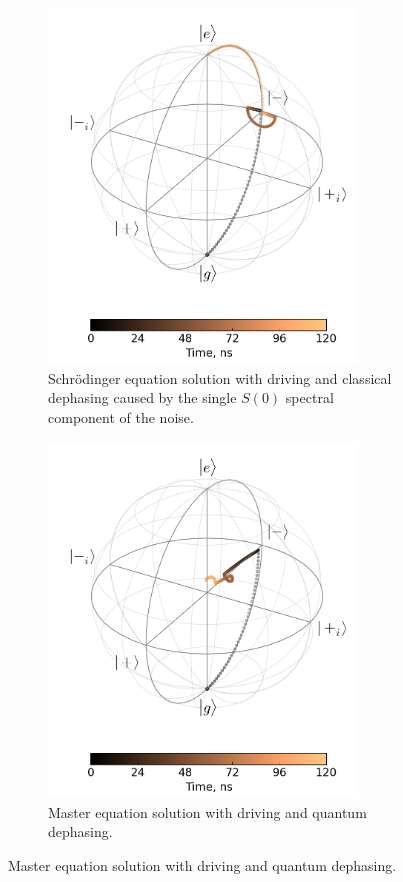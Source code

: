 \documentclass[12pt]{report}
\numberwithin{equation}{section}
\begin{document}
\begin{figure}
\begingroup
\captionsetup[subfigure]{width=0.9\textwidth}
\centering
\begin{subfigure}[t]{0.45\textwidth}
\centering
\includegraphics[width=0.9\textwidth]{cse_bloch_rf}
\caption{Schrödinger equation solution with driving and classical dephasing caused by the single $S(0)$ spectral component of the noise.}
\end{subfigure}
\begin{subfigure}[t]{0.45\textwidth}
\centering
\includegraphics[width=0.9\textwidth]{qse_bloch_rf}
\caption{Master equation solution with driving and quantum dephasing.}
\end{subfigure}


\end{figure}
\end{document}
